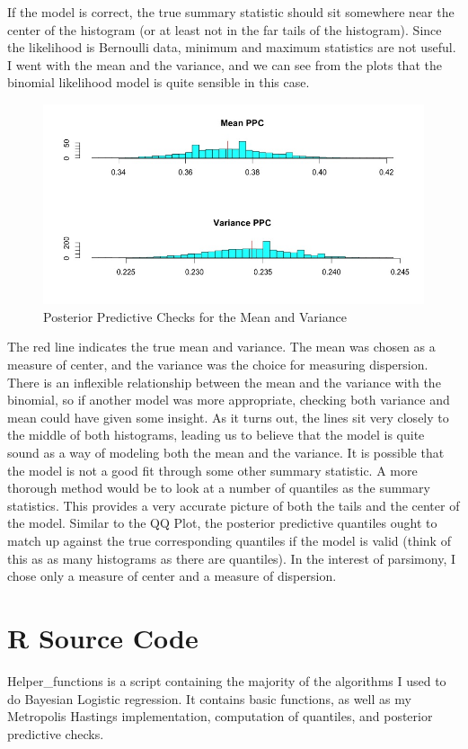 \documentclass[12pt]{article}
\begin{document}
If the model is correct, the true summary statistic should sit somewhere near the center of the histogram (or at least not in the far tails of the histogram). Since the likelihood is Bernoulli data, minimum and maximum statistics are not useful. I went with the mean and the variance, and we can see from the plots that the binomial likelihood model is quite sensible in this case.
\begin{figure}[H] \center
\includegraphics[scale=.50]{MCMC_p3_3.jpeg}
\caption*{Posterior Predictive Checks for the Mean and Variance}
\end{figure}

The red line indicates the true mean and variance. The mean was chosen as a measure of center, and the variance was the choice for measuring dispersion. There is an inflexible relationship between the mean and the variance with the binomial, so if another model was more appropriate, checking both variance and mean could have given some insight. As it turns out, the lines sit very closely to the middle of both histograms, leading us to believe that the model is quite sound as a way of modeling both the mean and the variance. It is possible that the model is not a good fit through some other summary statistic. A more thorough method would be to look at a number of quantiles as the summary statistics. This provides a very accurate picture of both the tails and the center of the model. Similar to the QQ Plot, the posterior predictive quantiles ought to match up against the true corresponding quantiles if the model is valid (think of this as as many histograms as there are quantiles). In the interest of parsimony, I chose only a measure of center and a measure of dispersion.

\section*{R Source Code}
Helper\_functions is a script containing the majority of the algorithms I used to do Bayesian Logistic regression. It contains basic functions, as well as my Metropolis Hastings implementation, computation of quantiles, and posterior predictive checks.

\end{document}
